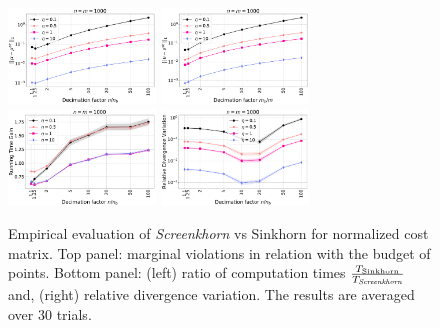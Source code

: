 \begin{figure}[t]
	\begin{center}
		\includegraphics[width=0.35\textwidth]{./figs/norm_M_Mu_marginals_toy_n1000}\hspace{2cm}
		\includegraphics[width=0.35\textwidth]{./figs/norm_M_Nu_marginals_toy_n1000} \\
		\includegraphics[width=0.35\textwidth]{./figs/norm_M_time_toy_n1000}\hspace{2cm}
		\includegraphics[width=0.35\textwidth]{./figs/norm_M_div_toy_n1000}
	\end{center}
	\caption{Empirical evaluation of \emph{Screenkhorn} vs Sinkhorn for normalized cost matrix. Top panel: marginal violations in relation with the budget of points. Bottom panel: (left) ratio of computation times    $\frac{T_{\text{Sinkhorn}}}{T_{\text{\emph{Screenkhorn}}}}$ and, (right) relative divergence variation. The results are averaged over $30$ trials.} 
		\label{fig:margin_expe}
\end{figure}
%
